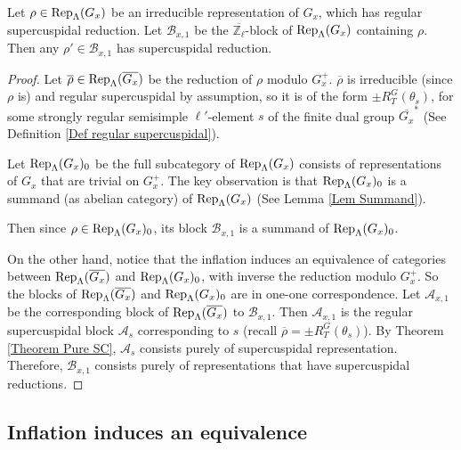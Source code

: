 		\begin{theorem} \label{Thm SC Red restate}
			Let $\rho \in \operatorname{\operatorname{Rep}}_{\Lambda}(G_x)$ be an irreducible representation of $G_x$, which has regular supercuspidal reduction. Let $\mathcal{B}_{x,1}$ be the $\overline{\mathbb{Z}_{\ell}}$-block of $\operatorname{\operatorname{Rep}}_{\Lambda}(G_x)$ containing $\rho$. Then any $\rho' \in \mathcal{B}_{x,1}$ has supercuspidal reduction.
		\end{theorem}
		
		\begin{proof}
			Let $\overline{\rho} \in \operatorname{\operatorname{Rep}}_{\Lambda}(\overline{G_x})$ be the reduction of $\rho$ modulo $G_x^+$. $\overline{\rho}$ is irreducible (since $\rho$ is) and regular supercuspidal by assumption, so it is of the form $\pm R_T^G(\theta_s)$, for some strongly regular semisimple $\ell'$-element $s$ of the finite dual group $\overline{G_x}^*$ (See Definition \ref{Def regular supercuspidal}).  
			
			Let $\operatorname{\operatorname{Rep}}_{\Lambda}(G_x)_0$ be the full subcategory of $\operatorname{\operatorname{Rep}}_{\Lambda}(G_x)$ consists of representations of $G_x$ that are trivial on $G_x^+$. The key observation is that $\operatorname{\operatorname{Rep}}_{\Lambda}(G_x)_0$ is a summand (as abelian category) of $\operatorname{\operatorname{Rep}}_{\Lambda}(G_x)$ (See Lemma \ref{Lem Summand}).
			
			Then since $\rho \in \operatorname{\operatorname{Rep}}_{\Lambda}(G_x)_0$, its block $\mathcal{B}_{x,1}$ is a summand of $\operatorname{\operatorname{Rep}}_{\Lambda}(G_x)_0$.
			
			On the other hand, notice that the inflation induces an equivalence of categories between $\operatorname{\operatorname{Rep}}_{\Lambda}(\overline{G_x})$ and $\operatorname{\operatorname{Rep}}_{\Lambda}(G_x)_0$, with inverse the reduction modulo $G_x^+$.
			So the blocks of $\operatorname{\operatorname{Rep}}_{\Lambda}(\overline{G_x})$ and $\operatorname{\operatorname{Rep}}_{\Lambda}(G_x)_0$ are in one-one correspondence. Let $\mathcal{A}_{x,1}$ be the corresponding block of $\operatorname{\operatorname{Rep}}_{\Lambda}(\overline{G_x})$ to $\mathcal{B}_{x,1}$. Then $\mathcal{A}_{x,1}$ is the regular supercuspidal block $\mathcal{A}_s$ corresponding to $s$ (recall $\overline{\rho}=\pm R_T^G(\theta_s)$). By Theorem \ref{Theorem Pure SC}, $\mathcal{A}_s$ consists purely of supercuspidal representation. Therefore, $\mathcal{B}_{x,1}$ consists purely of representations that have supercuspidal reductions. 
		\end{proof}
		
		
     \subsection{Inflation induces an equivalence}  \label{Subsection_inflation} 		
		
